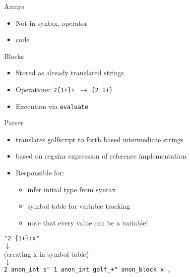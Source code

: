 \documentclass{beamer}
\begin{document}
\begin{frame}
    Arrays

    \begin{itemize}
        \item Not in syntax, operator
        \item code
    \end{itemize}
\end{frame}

\begin{frame}
    Blocks

    \begin{itemize}
        \item Stored as already translated strings
        \item Operations: \texttt{2\{1+\}+ }$\rightarrow$ \texttt{\{2 1+\}}
        \item Execution via \texttt{evaluate}
    \end{itemize}
\end{frame}


\begin{frame}
    Parser
    \begin{itemize}
        \item translates golfscript to forth based intermediate strings
        \item based on regular expression of reference implementation 
        \item Responsible for:
        \begin{itemize}
            \item infer initial type from syntax
            \item symbol table for variable tracking
            \item note that every value can be a variable!
        \end{itemize}
    \end{itemize}



\begin{center}
    \small{    
\texttt{"2 \{1+\}:x"}  \\
$\downarrow$ \\
(creating x in symbol table) \\
$\downarrow$ \\
\texttt{2 anon\_int s" 1 anon\_int golf\_+" anon\_block x , }
}
\end{center}

\end{frame}
\end{document}
